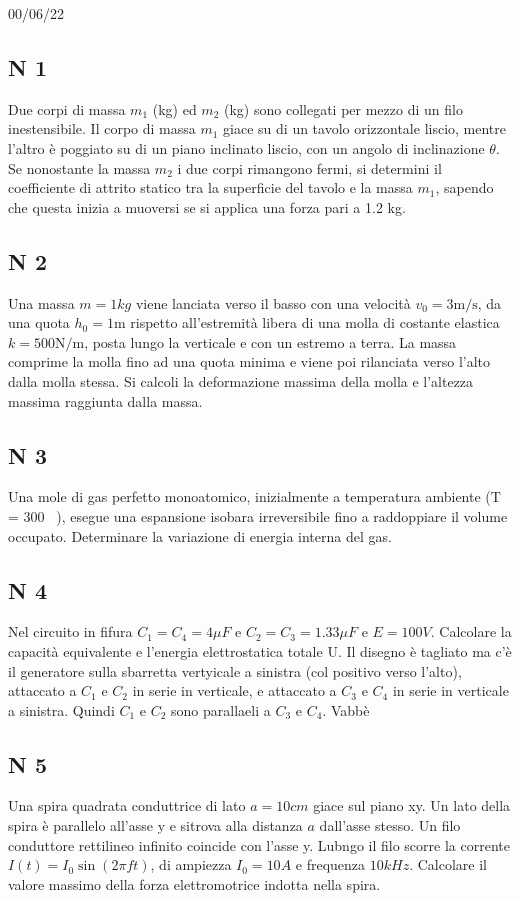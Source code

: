 \documentclass{article}
\begin{document}
00/06/22

\subsection{N 1}
Due corpi di massa $ m_1 $ (kg) ed $ m_2 $ (kg) sono collegati per mezzo di un filo inestensibile.
Il corpo di massa $ m_1 $ giace su di un tavolo orizzontale liscio,
mentre l'altro è poggiato su di un piano inclinato liscio, con un angolo di inclinazione $ \theta $.
Se nonostante la massa $ m_2 $ i due corpi rimangono fermi,
si determini il coefficiente di attrito statico tra la superficie del tavolo e la 
massa $ m_1 $, sapendo che questa inizia a muoversi se si applica una forza pari a 1.2 kg.

\subsection{N 2}
Una massa $ m = 1 {kg} $  viene lanciata verso il basso
con una velocità $ v_0 = 3 \text{m/s} $, da una quota $ h_0 = 1  \text{m} $
rispetto all’estremità libera di una molla di costante elastica $ k = 500 \text{N/m} $, 
posta lungo la verticale e con un estremo a terra. La massa comprime la molla fino ad una quota minima e viene poi rilanciata verso l’alto dalla molla stessa. 
Si calcoli la deformazione massima della molla e l’altezza massima raggiunta dalla massa.

\subsection{N 3}
Una mole di gas perfetto monoatomico, inizialmente a temperatura ambiente (T = 300 \, ), esegue una espansione isobara
irreversibile fino a raddoppiare il volume occupato. Determinare la variazione di energia interna del gas.

\subsection{N 4}
Nel circuito in fifura $C_1 = C_4 = 4 \mu F$  e $C_2 = C_3 = 1.33 \mu F$ e $E = 100 V$. Calcolare la capacità
equivalente e l'energia elettrostatica totale U. 
Il disegno è tagliato ma c'è il generatore sulla sbarretta vertyicale a sinistra (col positivo verso
l'alto), attaccato a $C_1$ e $C_2$  in serie in verticale, e attaccato a $C_3$  e $C_4$  in serie in verticale a sinistra.
Quindi $C_1$  e $C_2$ sono parallaeli a $C_3$ e $C_4$. Vabbè


\subsection{N 5}
Una spira quadrata conduttrice di lato $a= 10 cm$ giace sul piano xy. Un lato della spira è parallelo all'asse y 
e sitrova alla distanza $a$ dall'asse stesso. Un filo conduttore rettilineo infinito coincide con l'asse y.
Lubngo il filo scorre la corrente $I(t) = I_0 \sin\left(2 \pi f t \right)$, di ampiezza $I_0 = 10A$ e frequenza
$10 kHz$. Calcolare il valore massimo della forza elettromotrice indotta nella spira.
\end{document}

